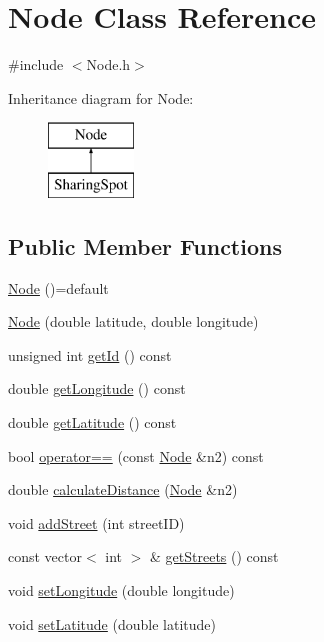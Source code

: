 \hypertarget{class_node}{}\section{Node Class Reference}
\label{class_node}


{\ttfamily \#include $<$Node.\+h$>$}

Inheritance diagram for Node\+:\begin{figure}[H]
\begin{center}
\leavevmode
\includegraphics[height=2.000000cm]{class_node}
\end{center}
\end{figure}
\subsection*{Public Member Functions}
\begin{DoxyCompactItemize}
\item 
\mbox{\hyperlink{class_node_a082d5efb0be81faaeb35dc02b2a4fc76}{Node}} ()=default
\item 
\mbox{\hyperlink{class_node_af4abc294f8eadd6fbf4714150838c709}{Node}} (double latitude, double longitude)
\item 
unsigned int \mbox{\hyperlink{class_node_af9b4c1c72ce14b69f5e99deb4440f489}{get\+Id}} () const
\item 
double \mbox{\hyperlink{class_node_ad4a79ebbcca46dae4638ffbe4d732399}{get\+Longitude}} () const
\item 
double \mbox{\hyperlink{class_node_a6a76240688eddc8a2942618074e28c92}{get\+Latitude}} () const
\item 
bool \mbox{\hyperlink{class_node_ad5e2b0cf9850f22ac9668971f66759dc}{operator==}} (const \mbox{\hyperlink{class_node}{Node}} \&n2) const
\item 
double \mbox{\hyperlink{class_node_a765bf631776ac8efed4b5626582643ad}{calculate\+Distance}} (\mbox{\hyperlink{class_node}{Node}} \&n2)
\item 
void \mbox{\hyperlink{class_node_aafb92e93512d42b7f60bf18878003214}{add\+Street}} (int street\+ID)
\item 
const vector$<$ int $>$ \& \mbox{\hyperlink{class_node_ae96d5a45681f9d0517cf927514aec7f5}{get\+Streets}} () const
\item 
void \mbox{\hyperlink{class_node_a1c64b31b2afe1d39a10809da9198a016}{set\+Longitude}} (double longitude)
\item 
void \mbox{\hyperlink{class_node_ac62ad99961481d9e4b21dd4332717927}{set\+Latitude}} (double latitude)
\end{DoxyCompactItemize}

